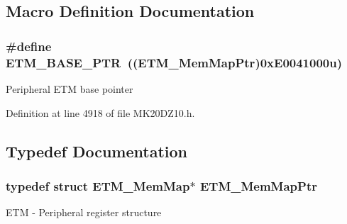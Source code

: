 \subsection{Macro Definition Documentation}
\subsubsection[{\texorpdfstring{E\+T\+M\+\_\+\+B\+A\+S\+E\+\_\+\+P\+TR}{ETM_BASE_PTR}}]{\setlength{\rightskip}{0pt plus 5cm}\#define E\+T\+M\+\_\+\+B\+A\+S\+E\+\_\+\+P\+TR~(({\bf E\+T\+M\+\_\+\+Mem\+Map\+Ptr})0x\+E0041000u)}\hypertarget{group___e_t_m___peripheral_ga5f573e73b1defe379e4a2e666d2e47c7}{}\label{group___e_t_m___peripheral_ga5f573e73b1defe379e4a2e666d2e47c7}
Peripheral E\+TM base pointer 

Definition at line 4918 of file M\+K20\+D\+Z10.\+h.



\subsection{Typedef Documentation}
\subsubsection[{\texorpdfstring{E\+T\+M\+\_\+\+Mem\+Map\+Ptr}{ETM_MemMapPtr}}]{\setlength{\rightskip}{0pt plus 5cm}typedef struct {\bf E\+T\+M\+\_\+\+Mem\+Map}$\ast$ {\bf E\+T\+M\+\_\+\+Mem\+Map\+Ptr}}\hypertarget{group___e_t_m___peripheral_ga88a18470aafe4a4922485f18a93c172d}{}\label{group___e_t_m___peripheral_ga88a18470aafe4a4922485f18a93c172d}
E\+TM -\/ Peripheral register structure 